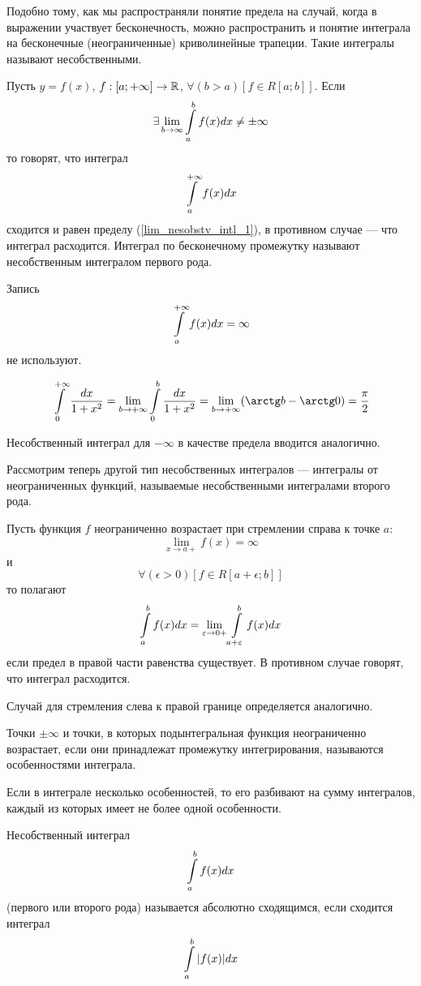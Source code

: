 Подобно тому, как мы распространяли понятие предела на случай, когда в выражении участвует бесконечность, можно распространить и понятие интеграла на бесконечные (неограниченные) криволинейные трапеции.
Такие интегралы называют несобственными.

\begin{opr}\label{opr_nesobstv_intl_1}
Пусть $y=f(x)$, $f:[a;+\infty]\to\mathbb{R}$, $\forall(b>a)[f\in R[a;b]]$.
Если 
\begin{equation}\label{lim_nesobstv_intl_1}
\exists \lim_{b\to\infty}\int\limits_a^b f(x)dx\neq \pm\infty
\end{equation}
то говорят, что интеграл
\begin{equation}\label{nesobstv_intl_1}
\int\limits_a^{+\infty}f(x)dx
\end{equation}
сходится и равен пределу (\ref{lim_nesobstv_intl_1}), в противном случае --- что интеграл расходится.
Интеграл по бесконечному промежутку называют несобственным интегралом первого рода.
\end{opr}

Запись
$$
\int\limits_a^{+\infty}f(x)dx=\infty
$$
не используют.

\begin{primer}
$$
\intl_0^{+\infty}\frac{dx}{1+x^2}=\lim_{b\to+\infty}\intl_0^{b}\frac{dx}{1+x^2}=
\lim_{b\to+\infty}(\arctg b - \arctg 0)=\frac{\pi}{2}
$$
\end{primer}

Несобственный интеграл для $-\infty$ в качестве предела вводится аналогично.

Рассмотрим теперь другой тип несобственных интегралов --- интегралы от неограниченных функций, называемые несобственными интегралами второго рода.

\begin{opr}
Пусть функция $f$ неограниченно возрастает при стремлении справа к точке $a$:
$$
\lim_{x\to a +}f(x)=\infty
$$
и
$$
\forall(\epsilon>0)[f\in R[a+\epsilon;b]]
$$
то полагают
$$
\int\limits_a^bf(x)dx=\lim_{\varepsilon\to 0+}\int\limits_{a+\varepsilon}^b f(x)dx
$$
если предел в правой части равенства существует.
В противном случае говорят, что интеграл расходится.
\end{opr}
Случай для стремления слева к правой границе определяется аналогично.

\begin{opr}
Точки $\pm\infty$ и точки, в которых подынтегральная функция неограниченно возрастает, если они принадлежат промежутку интегрирования, называются особенностями интеграла.
\end{opr}
Если в интеграле несколько особенностей, то его разбивают на сумму интегралов, каждый из которых имеет не более одной особенности.

\begin{opr}
Несобственный интеграл
$$
\int\limits_a^b f(x) dx
$$
(первого или второго рода) называется абсолютно сходящимся, если сходится интеграл
$$
\int\limits_a^b |f(x)| dx
$$

\end{opr}
